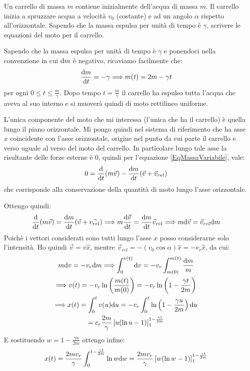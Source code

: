 \documentclass[../main.tex]{subfiles}
\begin{document}
\textex
Un carrello di massa $m$ contiene inizialmente dell'acqua di massa $m$. Il carrello inizia a spruzzare acqua a velocità $v_0$ (costante) e ad un angolo $\alpha$ rispetto all'orizzontale. Sapendo che la massa espulsa per unità di tempo è $\gamma$, scrivere le equazioni del moto per il carrello.

\solution
Sapendo che la massa espulsa per unità di tempo è $\gamma$ e ponendoci nella convenzione in cui $\mathrm{d} m$ è negativo, ricaviamo facilmente che:
\begin{equation*}
	\frac{\mathrm{d} m}{\mathrm{d} t}=-\gamma \Longrightarrow m(t)=2m-\gamma t
\end{equation*}
per ogni $0\le t \le \frac{m}{\gamma}$. Dopo tempo $t=\frac{m}{\gamma}$ il carrello ha espulso tutta l'acqua che aveva al suo interno e si muoverà quindi di moto rettilineo uniforme.

L'unica componente del moto che mi interessa (l'unica che ha il carrello) è quella lungo il piano orizzontale. Mi pongo quindi nel sistema di riferimento che ha asse $x$ coincidente con l'asse orizzontale, origine nel punto da cui parte il carrello e verso uguale al verso del moto del carrello.
In particolare lungo tale asse la risultante delle forze esterne è 0, quindi per l'equazione \cref{EqMassaVariabile}, vale:
\begin{equation*}
	0=\frac{\mathrm{d}}{\mathrm{d} t} (m\vec v)-\frac{\mathrm{d} m}{\mathrm{d} t}(\vec v+\vec{v}_{rel})
\end{equation*}
che corrisponde alla conservazione della quantità di moto lungo l'asse orizzontale.

Ottengo quindi:
\begin{equation*}
	\frac{\mathrm{d}}{\mathrm{d} t} (m\vec v)=\frac{\mathrm{d} m}{\mathrm{d} t}(\vec v+\vec{v_{rel}}) \Longrightarrow m \frac{\mathrm{d} \vec v}{\mathrm{d} t}=\frac{\mathrm{d} m}{\mathrm{d} t}\vec{v}_{rel}\Longrightarrow m\mathrm{d} \vec v=\vec{v}_{rel}\mathrm{d} m
\end{equation*}
Poichè i vettori considerati sono tutti lungo l'asse $x$ posso considerarne solo l'intensità. Ho quindi $\vec v=v\hat x$, mentre $\vec v_{rel}=-(v_0\cos\alpha)\hat x=-v_r\hat x$, da cui:
\begin{gather*}
	m\mathrm{d} v=-v_r\mathrm{d} m \Longrightarrow \int_0^{v(t)}\mathrm{d} v=-v_r\int_{m(0)}^{m(t)}\frac{\mathrm{d} m}{m}\\
	\Longrightarrow v(t)=-v_r \ln\left( \frac{m(t)}{m(0)} \right)=-v_r\ln\left( 1-\frac{\gamma t}{2m} \right) \\
	\Longrightarrow x(t)=\int_0^{t} v(u) \mathrm{d} u=-v_r \int_0^{t} \ln\left( 1-\frac{\gamma u}{2m} \right) \mathrm{d} u\\
							=c_r \frac{2m}{\gamma} \left[ u (\ln u-1) 	\right]_1^{1-\frac{\gamma t}{2m}}
\end{gather*}
E sostituendo $w= 1-\frac{\gamma u}{2m}$ ottengo infine:
\begin{gather*}
	x(t)=\frac{2m v_r}{\gamma}\int_{0}^{1-\frac{\gamma t}{2m}} \ln w \mathrm{d} w=\frac{2mv_r}{\gamma} \left[ w (\ln w-1) 	\right]_1^{1-\frac{\gamma t}{2m}}
\end{gather*}
\end{document}
